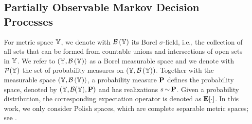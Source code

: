 \documentclass{ifacconf}
\begin{document}
%
%
%
%    
%   
%    
%    
   


\subsection{Partially Observable Markov  Decision Processes}
For metric space ${\mathbb{Y}}$, we denote with  $\mathcal{B}\left({\mathbb{Y}}\right)$ its Borel $\sigma$-field, i.e., the  
collection of all sets that can be formed from countable unions and intersections of open sets in ${\mathbb{Y}}$.
We refer to  $({\mathbb{Y}},\mathcal{B}\left({\mathbb{Y}}\right))$ as a Borel measurable space and we denote with $\mathcal P({\mathbb{Y}})$ the set of probability measures on $({\mathbb{Y}},\mathcal{B}\left({\mathbb{Y}}\right))$.
Together with the measurable space $({\mathbb{Y}},\mathcal{B}\left({\mathbb{Y}}\right))$,  a probability measure $\mathbf{P}$ defines the probability space, denoted by $({\mathbb{Y}},\mathcal{B}({\mathbb{Y}}),\mathbf{P})$ and has realizations  $s{\,\sim\,}\mathbf{P}$.     Given a probability distribution, the corresponding expectation operator is denoted as  $\mathbf{E}[\cdot]$.
In this work,  we only consider Polish spaces, which are complete separable metric spaces; see \citep{bogachev2007measure}. 
\end{document}
